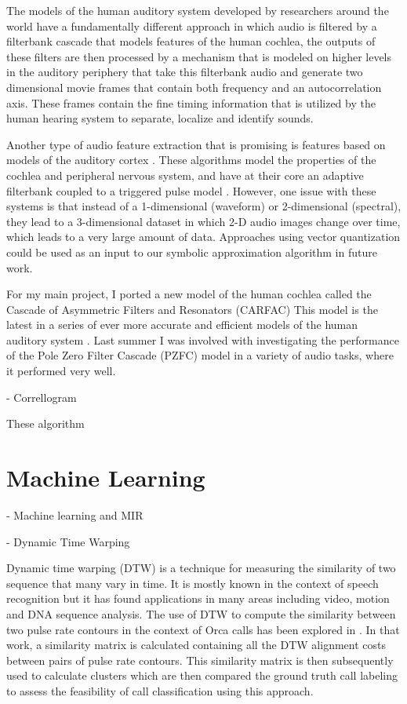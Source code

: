 The models of the human auditory system developed by researchers
around the world have a fundamentally different approach in which
audio is filtered by a filterbank cascade that models features of the
human cochlea, the outputs of these filters are then processed by a
mechanism that is modeled on higher levels in the auditory periphery
that take this filterbank audio and generate two dimensional movie
frames that contain both frequency and an autocorrelation axis.  These
frames contain the fine timing information that is utilized by the
human hearing system to separate, localize and identify sounds.

Another type of audio feature extraction that is promising is features
based on models of the auditory cortex \cite{lyon82}.  These
algorithms model the properties of the cochlea and peripheral nervous
system\cite{lyon10}, and have at their core an adaptive filterbank
coupled to a triggered pulse model \cite{waltersphd}.  However, one
issue with these systems is that instead of a 1-dimensional (waveform)
or 2-dimensional (spectral), they lead to a 3-dimensional dataset in
which 2-D audio images change over time, which leads to a very large
amount of data.  Approaches using vector quantization could be used as
an input to our symbolic approximation algorithm in future work.

For my main project, I ported a new model of the human cochlea called
the Cascade of Asymmetric Filters and Resonators (CARFAC) \cite{lyon2011cas}  This model
is the latest in a series of ever more accurate and efficient models
of the human auditory system \cite{lyon82}.  Last summer I was
involved with investigating the performance of the Pole Zero Filter
Cascade (PZFC) model \cite{lyon10} in a variety of audio tasks, where
it performed very well.

- Correllogram

These algorithm 



\section{Machine Learning}

- Machine learning and MIR

- Dynamic Time Warping

Dynamic time warping (DTW) is a technique for measuring the similarity
of two sequence that many vary in time. It is mostly known in the context
of speech recognition \cite{sakoe78} but it has found applications in
many areas including video, motion and DNA sequence analysis. The use
of DTW to compute the similarity between two pulse rate contours in
the context of Orca calls has been explored in
\cite{brown07_orca_dtw}. In that work, a similarity matrix is
calculated containing all the DTW alignment costs between pairs of
pulse rate contours. This similarity matrix is then subsequently used
to calculate clusters which are then compared the ground truth call
labeling to assess the feasibility of call classification using this
approach.  

